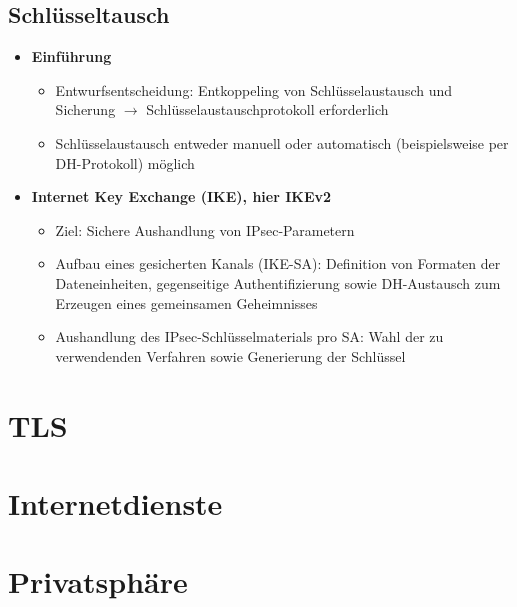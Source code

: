 \subsection{Schlüsseltausch}
\begin{itemize}
	\item \textbf{Einführung}
	\begin{itemize}
		\item Entwurfsentscheidung: Entkoppeling von Schlüsselaustausch und Sicherung \(\rightarrow\) Schlüsselaustauschprotokoll erforderlich
		\item Schlüsselaustausch entweder manuell oder automatisch (beispielsweise per DH-Protokoll) möglich
	\end{itemize}
	\item \textbf{Internet Key Exchange (IKE), hier IKEv2}
	\begin{itemize}
		\item Ziel: Sichere Aushandlung von IPsec-Parametern
		\item Aufbau eines gesicherten Kanals (IKE-SA): Definition von Formaten der Dateneinheiten, gegenseitige Authentifizierung sowie DH-Austausch zum Erzeugen eines gemeinsamen Geheimnisses
		\item Aushandlung des IPsec-Schlüsselmaterials pro SA: Wahl der zu verwendenden Verfahren sowie Generierung der Schlüssel
	\end{itemize}
\end{itemize}



\section{TLS}



\section{Internetdienste}



\section{Privatsphäre}
